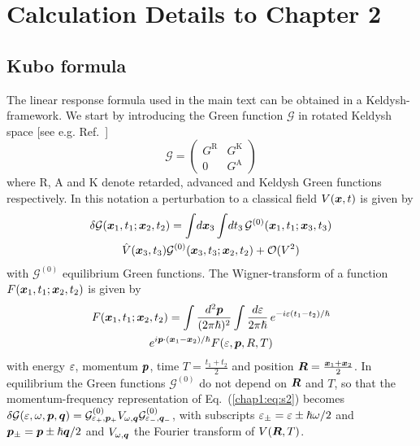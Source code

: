 \chapter{Calculation Details to Chapter 2}
\section{Kubo formula}
The linear response formula used in the main text can be obtained in a Keldysh-framework. We start by introducing the Green function $\mathcal{G}$ in rotated Keldysh space [see e.g. Ref.~\cite{rammer_quantum_1986}]
\begin{equation}
    \mathcal{G}=\begin{pmatrix}G^\text{R}&G^\text{K}\\0&G^\text{A}\end{pmatrix}
\end{equation}
where R, A and K denote retarded, advanced and Keldysh Green functions respectively. In this notation a perturbation to a classical field $V(\boldsymbol{x},t)$ is given by
\begin{multline}
    \delta\mathcal{G}(\boldsymbol{x}_1,t_1;\boldsymbol{x}_2,t_2)=\int\!d\boldsymbol{x}_3\int\!dt_3\, \mathcal{G}^{(0)}(\boldsymbol{x}_1,t_1;\boldsymbol{x}_3,t_3)\\\hat{V}(\boldsymbol{x}_3,t_3)\mathcal{G}^{(0)}(\boldsymbol{x}_3,t_3;\boldsymbol{x}_2,t_2)+\mathcal{O}(V^2)
    \label{chap1:eq:s2}
\end{multline}
with $\mathcal{G}^{(0)}$ equilibrium Green functions. The Wigner-transform of a function $F(\boldsymbol{x}_1,t_1;\boldsymbol{x}_2,t_2)$ is given by
  \begin{multline}
    F(\boldsymbol{x}_1,t_1;\boldsymbol{x}_2,t_2)=\int\frac{d^2\boldsymbol{p}}{(2\pi\hslash)^2}\int \frac{d\varepsilon}{2\pi\hslash}\,e^{-i\varepsilon(t_1-t_2)/\hslash}\\e^{i\boldsymbol{p}\cdot(\boldsymbol{x}_1-\boldsymbol{x}_2)/\hslash}F(\varepsilon,\boldsymbol{p},R,T)
   \end{multline}
with energy $\varepsilon$, momentum $\boldsymbol{p}$, time $T=\frac{t_1+t_2}{2}$ and position $\boldsymbol{R}=\frac{\boldsymbol{x}_1+\boldsymbol{x}_2}{2}$. In equilibrium the Green functions $\mathcal{G}^{(0)}$ do not depend on $\boldsymbol{R}$ and $T$, so that the momentum-frequency representation of Eq.~(\ref{chap1:eq:s2}) becomes 
   $\delta\mathcal{G}(\varepsilon,\omega,\boldsymbol{p},\boldsymbol{q})= \mathcal{G}^{(0)}_{\varepsilon_+,\boldsymbol{p}_+} V_{\omega,\boldsymbol{q}}\mathcal{G}^{{(0)}}_{\varepsilon_-,\boldsymbol{q}_-}$, 
with subscripts $\varepsilon_\pm=\varepsilon\pm\hslash\omega/2$ and $\boldsymbol{p}_\pm=\boldsymbol{p}\pm\hslash\boldsymbol{q}/2$ and $V_{\omega,\boldsymbol{q}}$ the Fourier transform of $V(\boldsymbol{R},T)$. 

